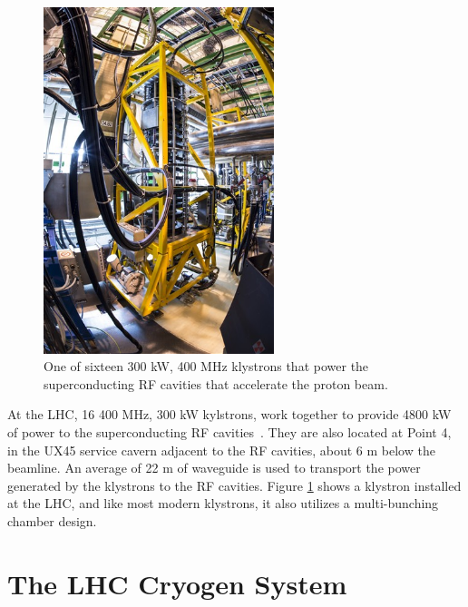 \begin{figure}[h]
   \centering
  \includegraphics[width=0.6\textwidth]{Figures/LHC_Diagrams/LHC_Klystron_Installed.jpg}
  \caption{One of sixteen 300 kW, 400 MHz klystrons that power the
    superconducting RF cavities that accelerate the proton beam.} \label{fig:lhc_klystron}
\end{figure}

\par At the LHC, 16 400 MHz, 300 kW kylstrons, work together to provide 4800 kW
of power to the superconducting RF
cavities~\cite{lhc:machine_description}.  They are also located at
Point 4, in the UX45 service cavern adjacent to the RF cavities, about
6 m below the beamline.  An average of 22 m of waveguide is used to
transport the power generated by the klystrons to the RF cavities.
Figure \ref{fig:lhc_klystron} shows a klystron installed at the LHC, and like most modern
klystrons, it also utilizes a multi-bunching chamber design.

\section{The LHC Cryogen System}
\label{lhc_cryogen_overview}


